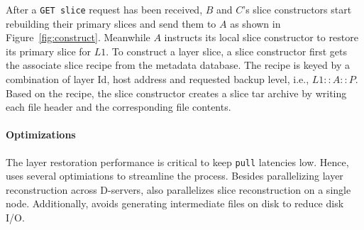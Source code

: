 After a \texttt{GET slice} request has been received, 
$B$ and $C$'s slice constructors start rebuilding their primary slices and send them to $A$ as shown in Figure~\ref{fig:construct}.
Meanwhile $A$ instructs its local slice constructor to restore its primary slice for $L1$.
%
To construct a layer slice, a slice constructor first gets the associate slice recipe
from the metadata database. The recipe is keyed by a combination of layer Id, host address and requested
backup level, i.e., $L1::A::P$.
%
Based on the recipe, the slice constructor creates a slice tar archive by writing each file header and the corresponding
file contents.
\paragraph{Optimizations}
The layer restoration performance is critical to keep \texttt{pull} latencies low. Hence,
\sysname uses several optimiations to streamline the process.
%
Besides parallelizing layer reconstruction across D-servers, \sysname also
parallelizes slice reconstruction on a single node.
%
Additionally, \sysname avoids generating intermediate files on disk to reduce disk I/O.
%
%

